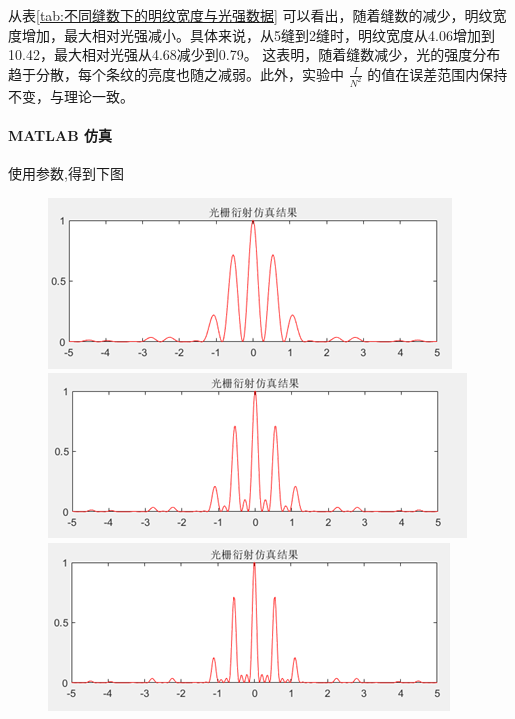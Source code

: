 \documentclass[a4paper]{../phyreport}
\begin{document}
从表\ref{tab:不同缝数下的明纹宽度与光强数据} 可以看出，随着缝数的减少，明纹宽度增加，最大相对光强减小。具体来说，从5缝到2缝时，明纹宽度从4.06增加到10.42，最大相对光强从4.68减少到0.79。
这表明，随着缝数减少，光的强度分布趋于分散，每个条纹的亮度也随之减弱。此外，实验中 $\frac{I}{N^2}$ 的值在误差范围内保持不变，与理论一致。

\paragraph{MATLAB 仿真}使用参数,得到下图
\begin{figure}[H]
  \centering
  \begin{minipage}[b]{0.45\linewidth}
    \centering
\includegraphics[width=0.9\linewidth]{fig/仿真/2.png}
  \end{minipage}
  \begin{minipage}[b]{0.45\linewidth}
    \centering
\includegraphics[width=0.9\linewidth]{fig/仿真/3.png}
  \end{minipage}
  \begin{minipage}[b]{0.45\linewidth}
    \centering
\includegraphics[width=0.9\linewidth]{fig/仿真/4.png}

\end{minipage}
\end{figure}
\end{document}
